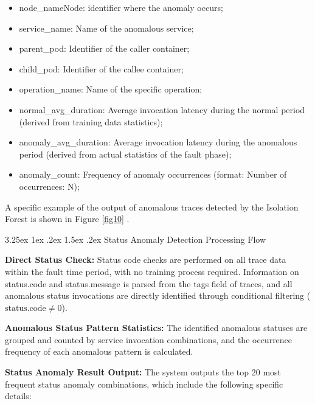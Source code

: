 \documentclass[10pt]{article}
\makeatletter
\let\oldref\ref
\renewcommand{\ref}[1]{%
    \textcolor{blue}{\oldref{#1}}%
}
\renewcommand{\paragraph}{%
    \@startsection{paragraph}{4}{\z@}%
    {3.25ex \@plus1ex \@minus.2ex}%
    {1.5ex \@plus.2ex}%
    {\normalfont\normalsize\itshape}%
}
\makeatother
\begin{document}
\begin{itemize}
    \item node\_nameNode: identifier where the anomaly occurs;
    \item service\_name: Name of the anomalous service;
    \item parent\_pod: Identifier of the caller container;
    \item child\_pod: Identifier of the callee container;
    \item operation\_name: Name of the specific operation;
    \item normal\_avg\_duration: Average invocation latency during the normal period (derived from training data statistics);
    \item anomaly\_avg\_duration: Average invocation latency during the anomalous period (derived from actual statistics of the fault phase);
    \item anomaly\_count: Frequency of anomaly occurrences (format: Number of occurrences: N);
\end{itemize}

A specific example of the output of anomalous traces detected by the Isolation Forest is shown in Figure \ref{fig10}.

\paragraph{Status Anomaly Detection Processing Flow}

\textbf{Direct Status Check:} Status code checks are performed on all trace data within the fault time period, with no training process required. Information on status.code and status.message is parsed from the tags field of traces, and all anomalous status invocations are directly identified through conditional filtering (\( \text{status.code} \neq 0 \)).

\textbf{Anomalous Status Pattern Statistics:} The identified anomalous statuses are grouped and counted by service invocation combinations, and the occurrence frequency of each anomalous pattern is calculated.

\textbf{Status Anomaly Result Output:} The system outputs the top 20 most frequent status anomaly combinations, which include the following specific details:
\end{document}
